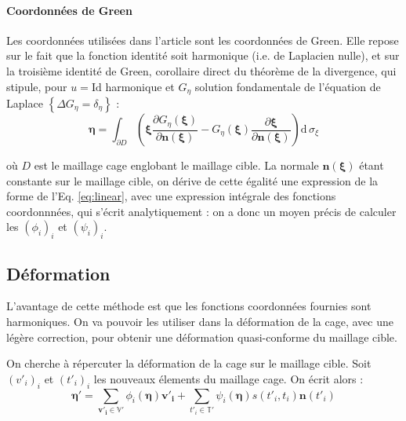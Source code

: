 \documentclass[10pt,a4paper]{article}
\begin{document}
\paragraph{Coordonnées de Green}Les coordonnées utilisées dans l'article sont les coordonnées de Green. Elle repose sur le fait que la fonction identité soit harmonique (i.e. de Laplacien nulle), et sur la troisième identité de Green, corollaire direct du théorème de la divergence, qui stipule, pour $u = \mathrm{Id}$ harmonique et $G_\eta$ solution fondamentale de l'équation de Laplace $\left\lbrace \Delta G_\eta = \delta_\eta \right\rbrace$ :
\begin{equation}
\boldsymbol\eta = \int_{\partial D} \left(
	\boldsymbol\xi
		\frac{\partial G_\eta \left(\boldsymbol\xi \right)}
		{\partial \mathbf{n \left( \boldsymbol\xi \right)}}
	- G_\eta \left( \boldsymbol\xi \right) 
		\frac{\partial \boldsymbol\xi }
		{\partial \mathbf{n \left( \boldsymbol\xi \right)}}
\right)
\mathrm{d}\, \sigma_\xi
\end{equation}

où $D$ est le maillage cage englobant le maillage cible. La normale $\mathbf{n \left( \boldsymbol\xi \right)}$ étant constante sur le maillage cible, on dérive de cette égalité une expression de la forme de l'Eq. \ref{eq:linear}, avec une expression intégrale des fonctions coordonnnées, qui s'écrit analytiquement : on a donc un moyen précis de calculer les $\left( \phi_i \right)_i$ et $\left( \psi_i \right)_i$.

\subsection{Déformation}

L'avantage de cette méthode est que les fonctions coordonnées fournies sont harmoniques. On va pouvoir les utiliser dans la déformation de la cage, avec une légère correction, pour obtenir une déformation quasi-conforme du maillage cible.

On cherche à répercuter la déformation de la cage sur le maillage cible. Soit $\left( v'_i \right)_i$ et $\left( t'_i \right)_i$ les nouveaux élements du maillage cage. On écrit alors :
\begin{equation}
\label{eq:def}
\mathbf{\eta'} = \sum_{\mathbf{v'_i} \in \mathbb{V}'} \phi_i \left( \mathbf{\eta} \right) \mathbf{v'_i} 
+ \sum_{t'_i \in \mathbb{T}'} \psi_i \left( \mathbf{\eta} \right) s \left(t'_i, t_i \right) \mathbf{n} \left( t'_i \right)
\end{equation}
\end{document}
